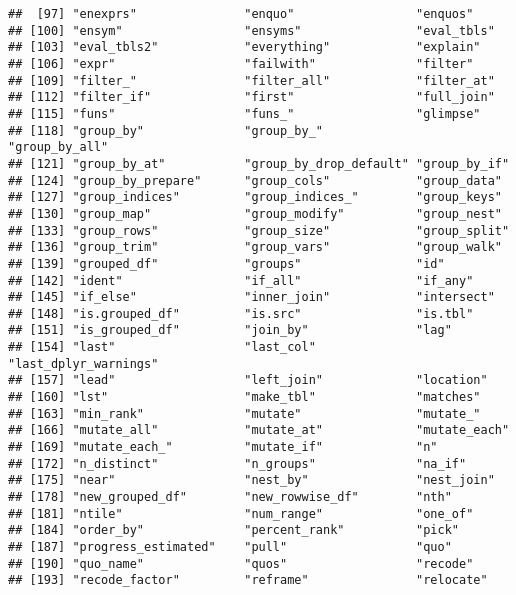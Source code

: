 \documentclass[
]{book}
\begin{document}
\begin{verbatim}
##  [97] "enexprs"               "enquo"                 "enquos"               
## [100] "ensym"                 "ensyms"                "eval_tbls"            
## [103] "eval_tbls2"            "everything"            "explain"              
## [106] "expr"                  "failwith"              "filter"               
## [109] "filter_"               "filter_all"            "filter_at"            
## [112] "filter_if"             "first"                 "full_join"            
## [115] "funs"                  "funs_"                 "glimpse"              
## [118] "group_by"              "group_by_"             "group_by_all"         
## [121] "group_by_at"           "group_by_drop_default" "group_by_if"          
## [124] "group_by_prepare"      "group_cols"            "group_data"           
## [127] "group_indices"         "group_indices_"        "group_keys"           
## [130] "group_map"             "group_modify"          "group_nest"           
## [133] "group_rows"            "group_size"            "group_split"          
## [136] "group_trim"            "group_vars"            "group_walk"           
## [139] "grouped_df"            "groups"                "id"                   
## [142] "ident"                 "if_all"                "if_any"               
## [145] "if_else"               "inner_join"            "intersect"            
## [148] "is.grouped_df"         "is.src"                "is.tbl"               
## [151] "is_grouped_df"         "join_by"               "lag"                  
## [154] "last"                  "last_col"              "last_dplyr_warnings"  
## [157] "lead"                  "left_join"             "location"             
## [160] "lst"                   "make_tbl"              "matches"              
## [163] "min_rank"              "mutate"                "mutate_"              
## [166] "mutate_all"            "mutate_at"             "mutate_each"          
## [169] "mutate_each_"          "mutate_if"             "n"                    
## [172] "n_distinct"            "n_groups"              "na_if"                
## [175] "near"                  "nest_by"               "nest_join"            
## [178] "new_grouped_df"        "new_rowwise_df"        "nth"                  
## [181] "ntile"                 "num_range"             "one_of"               
## [184] "order_by"              "percent_rank"          "pick"                 
## [187] "progress_estimated"    "pull"                  "quo"                  
## [190] "quo_name"              "quos"                  "recode"               
## [193] "recode_factor"         "reframe"               "relocate"             

\end{verbatim}
\end{document}
